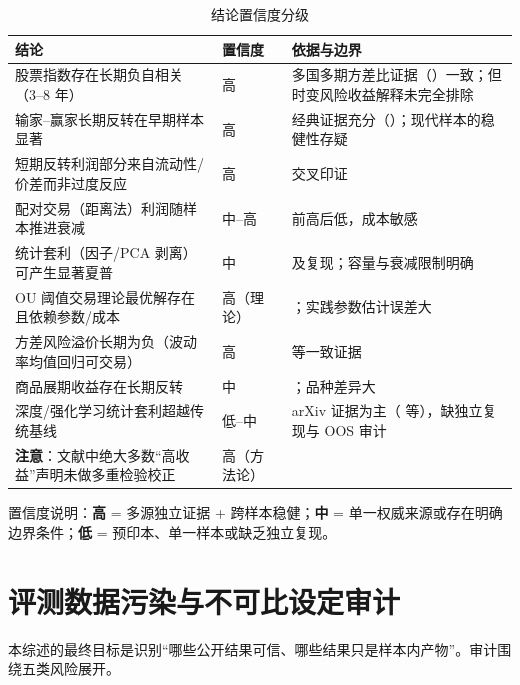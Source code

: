 \documentclass[11pt,a4paper]{ctexart}
\begin{document}
\begin{table}[htbp]
\centering
\caption{结论置信度分级}
\label{tab:confidence}
\begin{tabular}{@{}>{\raggedright\arraybackslash}p{4.6cm}>{\raggedright\arraybackslash}p{2.0cm}>{\raggedright\arraybackslash}p{8.2cm}@{}}
\toprule
结论 & 置信度 & 依据与边界 \\
\midrule
股票指数存在长期负自相关（3--8 年） & 高 & 多国多期方差比证据（\cite{poterbasummers1988,lomackinlay1988}）一致；但时变风险收益解释未完全排除 \\
输家--赢家长期反转在早期样本显著 & 高 & 经典证据充分（\cite{debondt1985,lakonishok1994}）；现代样本的稳健性存疑 \\
短期反转利润部分来自流动性/价差而非过度反应 & 高 & \cite{lehmann1990,jegadeesh1990,lomackinlay1990} 交叉印证 \\
配对交易（距离法）利润随样本推进衰减 & 中--高 & \cite{gatev2006,dofaff2012} 前高后低，成本敏感 \\
统计套利（因子/PCA 剥离）可产生显著夏普 & 中 & \cite{avellaneda2010} 及复现；容量与衰减限制明确 \\
OU 阈值交易理论最优解存在且依赖参数/成本 & 高（理论） & \cite{boguslavsky2004,martin2011}；实践参数估计误差大 \\
方差风险溢价长期为负（波动率均值回归可交易） & 高 & \cite{carrwu2009} 等一致证据 \\
商品展期收益存在长期反转 & 中 & \cite{erbharvey2006}；品种差异大 \\
深度/强化学习统计套利超越传统基线 & 低--中 & arXiv 证据为主（\cite{arxiv_dl_sa,arxiv_rl_sa} 等），缺独立复现与 OOS 审计 \\
\textbf{注意}：文献中绝大多数“高收益”声明未做多重检验校正 & 高（方法论） & \cite{white2000,sullivan1999,harveylz2016,bailey2014pbo} \\
\bottomrule
\end{tabular}
\end{table}

置信度说明：\textbf{高} = 多源独立证据 + 跨样本稳健；\textbf{中} = 单一权威来源或存在明确边界条件；\textbf{低} = 预印本、单一样本或缺乏独立复现。

\section{评测数据污染与不可比设定审计}\label{sec:audit}

本综述的最终目标是识别“哪些公开结果可信、哪些结果只是样本内产物”。审计围绕五类风险展开。
\end{document}
